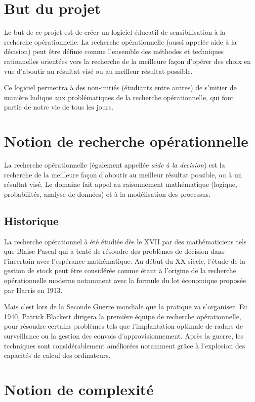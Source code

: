 \setcounter{footnote}{0}

\section{But du projet}
Le but de ce projet est de créer un logiciel éducatif de sensibilisation à la recherche
opérationnelle. La recherche opérationnelle (aussi appelée aide à la décision) peut être définie
comme l'ensemble des méthodes et techniques rationnelles orientées vers la recherche de
la meilleure façon d'opérer des choix en vue d'aboutir au résultat visé ou au meilleur résultat possible.%
~\cite{ref.yrr}

Ce logiciel permettra à des non-initiés (étudiants entre autres) de s'initier
de manière ludique aux problématiques de la recherche opérationnelle, qui font partie de notre
vie de tous les jours.

\section{Notion de recherche opérationnelle}
La recherche opérationnelle (également appellée \emph{aide à la decision})
est la recherche de la meilleure façon d'aboutir au meilleur résultat
possible, ou à un résultat visé. Le domaine fait appel au raisonnement 
mathématique (logique, probabilités, analyse de données) et à la modélisation 
des processus. 

\subsection{Historique}
La recherche opérationnel à été étudiée dès le XVII par des mathématiciens tels que Blaise Pascal qui 
a tenté de résoudre des problèmes de décision dans l'incertain avec l'espérance mathématique. 
Au début du XX siècle, l'étude de la gestion de stock peut être considérée comme étant 
à l'origine de la recherche opérationnelle moderne notamment avec la formule du lot économique 
proposée par Harris en 1913. 

Mais c'est lors de la Seconde Guerre mondiale que la pratique va s'organiser. 
En 1940, Patrick Blackett dirigera la première équipe de recherche opérationnelle, 
pour résoudre certains problèmes tels que l'implantation optimale de radars de surveillance 
ou la gestion des convois d'approvisionnement. Après la guerre, les techniques sont considérablement améliorées
notamment grâce à l'explosion des capacités de calcul des ordinateurs.
\section{Notion de complexité}
